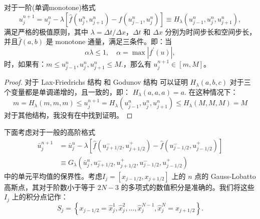 \documentclass{book}
\begin{document}
\begin{example}
\begin{example}{}{}
\begin{example}
\begin{example}
\begin{example}
\begin{theorem}
    对于一阶(单调monotone)格式
    \begin{equation}
        u_{j}^{n+1}=u_{j}^{n}-\lambda\left[\hat{f}\left(u_{j}^{n}, u_{j+1}^{n}\right)-\hat{f}\left(u_{j-1}^{n}, u_{j}^{n}\right)\right] \equiv H_{\lambda}\left(u_{j-1}^{n}, u_{j}^{n}, u_{j+1}^{n}\right),
    \end{equation}
    满足严格的极值原则，其中 $\lambda=\Delta t / \Delta x$，$\Delta t$  和  $\Delta x$ 分别为时间步长和空间步长，并且$\hat{f}(a, b)$ 是 monotone 通量，满足三条件。即：当
    \begin{equation}
        \label{eqa:pp_1D_1Order_CFL}
        \alpha \lambda \leq 1, \quad \alpha=\max \left|f^{\prime}(u)\right|,
    \end{equation}
    时，如果有：$m \leq u_{j-1}^{n}, u_{j}^{n}, u_{j+1}^{n} \leq M .$，那么有 $u_{j}^{n+1}\in[m,M]$。
\end{theorem}
\begin{proof}
    对于 Lax-Friedrichs 结构 和 Godunov 结构
    可以证明 $H_{\lambda}(a, b, c)$  对于三个变量都是单调递增的，且一致的，即： $H_{\lambda}(a, a, a)=a$. 在这种情况下：
    \begin{equation}
        m=H_{\lambda}(m, m, m) \leq u_{j}^{n+1}=H_{\lambda}\left(u_{j-1}^{n}, u_{j}^{n}, u_{j+1}^{n}\right) \leq H_{\lambda}(M, M, M)=M
    \end{equation}
    对于其他结构，我没有在\cite{PP-review}中找到证明。
\end{proof}
下面考虑对于一般的高阶格式
\begin{equation}
    \label{eqa:pp_high_order_scheme}
    \begin{aligned}
        \bar{u}_{j}^{n+1} & =\bar{u}_{j}^{n}-\lambda\left[\hat{f}\left(u_{j+1 / 2}^{-}, u_{j+1 / 2}^{+}\right)-\hat{f}\left(u_{j-1 / 2}^{-}, u_{j-1 / 2}^{+}\right)\right] \\
                          & \equiv G_{\lambda}\left(\bar{u}_{j}^{n}, u_{j+1 / 2}^{-}, u_{j+1 / 2}^{+}, u_{j-1 / 2}^{-}, u_{j-1 / 2}^{+}\right)
    \end{aligned}
\end{equation}
中的单元平均值的保界性。考虑$I_{j}=\left[x_{j-1 / 2}, x_{j+1 / 2}\right]$ 上的 $n$ 点的 Gauss-Lobatto 高斯点，其对于阶数小于等于 $2N-3$ 的多项式的数值积分是准确的。我们将这些 $I_{j}$ 上的积分点记作：
\begin{equation}
    S_{j}=\left\{x_{j-1 / 2}=\hat{x}_{j}^{1}, \hat{x}_{j}^{2}, \ldots, \hat{x}_{j}^{N-1}, \hat{x}_{j}^{N}=x_{j+1 / 2}\right\} .
\end{equation}

\end{example}
\end{example}
\end{example}
\end{example}
\end{example}
\end{document}
